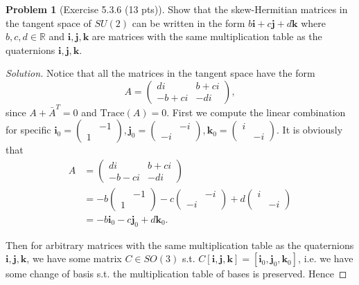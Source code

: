 \documentclass{article}
\theoremstyle{definition}
\newtheorem{problem}{Problem}
\theoremstyle{plain}
\begin{document}
\begin{problem}[Exercise 5.3.6 (13 pts)]
Show that the skew-Hermitian matrices in the tangent space of $SU(2)$ can be written in the form $b\bm{i}+c\bm{j}+d\bm{k}$ where $b,c,d\in\mathbb{R}$ and $\bm{i},\bm{j},\bm{k}$ are matrices with the same multiplication table as the quaternions $\bm{i},\bm{j},\bm{k}$.
\end{problem}
\begin{adjustwidth}{0.7cm}{}
\color{blue}
\begin{proof}[Solution]
Notice that all the matrices in the tangent space have the form
\begin{displaymath}
A=\begin{pmatrix}di&b+ci\\ -b+ci&-di\end{pmatrix},
\end{displaymath}
since $A+\bar{A}^T=0$ and $\mathrm{Trace}(A)=0$. First we compute the linear combination for specific $\bm{i}_0=\begin{pmatrix}&-1\\1&\end{pmatrix},\bm{j}_0=\begin{pmatrix}&-i\\-i&\end{pmatrix},\bm{k}_0=\begin{pmatrix}i&\\&-i\end{pmatrix}$. It is obviously that
\begin{align*}
A&=\begin{pmatrix}di&b+ci\\ -b-ci&-di\end{pmatrix}\\
&=-b\begin{pmatrix}&-1\\1&\end{pmatrix}-c\begin{pmatrix}&-i\\-i&\end{pmatrix}+d\begin{pmatrix}i&\\&-i\end{pmatrix}\\
&=-b\bm{i}_0-c\bm{j}_0+d\bm{k}_0.
\end{align*}\par
Then for arbitrary matrices with the same multiplication table as the quaternions $\bm{i},\bm{j},\bm{k}$, we have some matrix $C\in SO(3)$ s.t. $C[\bm{i},\bm{j},\bm{k}]=[\bm{i}_0,\bm{j}_0,\bm{k}_0]$, i.e. we have some change of basis s.t. the multiplication table of bases is preserved. Hence

\end{proof}
\end{adjustwidth}
\end{document}
